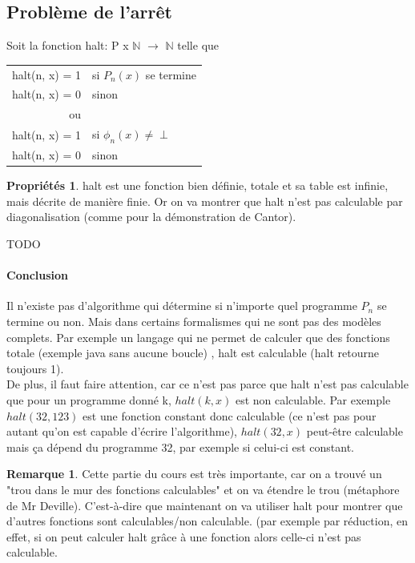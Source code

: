 \documentclass[11pt,a4paper]{article}
\newcommand{\N}{\mathbb{N}}
\theoremstyle{definition}
\newtheorem{myprop}[mydef]{Propriétés}
\newtheorem{myrem}[mydef]{Remarque}
\begin{document}

\subsection{Problème de l'arrêt}
\label{sub:probl_me_de_l_arr_t}

Soit la fonction halt: P x $\N$ $\rightarrow$ $\N$ telle que \\
\begin{tabular}{rl}
  halt(n, x) = 1 & si $P_n(x)$ se termine \\
  halt(n, x) = 0 & sinon \\
  ou &\\
  halt(n, x) = 1 & si $\phi_n(x)\neq \perp$ \\
  halt(n, x) = 0 & sinon \\
\end{tabular}

\begin{myprop}
	halt est une fonction bien définie, totale et sa table est infinie, mais décrite 
	de manière finie. Or on va montrer que halt n'est pas calculable par 
	diagonalisation (comme pour la démonstration de Cantor).\\
\end{myprop}

TODO \\

\paragraph{Conclusion} Il n'existe pas d'algorithme qui détermine si n'importe 
quel programme $P_n$ se termine ou non. Mais dans certains formalismes qui ne 
sont pas des modèles complets. Par exemple un langage qui ne permet de calculer 
que des fonctions totale (exemple java sans aucune boucle)
, halt est calculable (halt retourne toujours 1). \\

De plus, il faut faire attention, car ce n'est pas parce que halt n'est pas 
calculable que pour un programme donné k, $halt(k,x)$ est non calculable. Par 
exemple $halt(32,123)$ est une fonction constant donc calculable (ce n'est pas 
pour autant qu'on est capable d'écrire l'algorithme), $halt(32,x)$ peut-être 
calculable mais ça dépend du 
programme 32, par exemple si celui-ci est constant.

\begin{myrem}
	Cette partie du cours est très importante, car on a trouvé un 
	"trou dans le mur des fonctions calculables" et on va étendre le trou (métaphore
	de Mr Deville). C'est-à-dire que maintenant on va utiliser halt pour montrer 
	que d'autres fonctions sont calculables/non calculable. (par exemple 
	par réduction, en effet, si on peut calculer halt grâce à une fonction 
	alors celle-ci n'est pas calculable.
\end{myrem}
\end{document}
